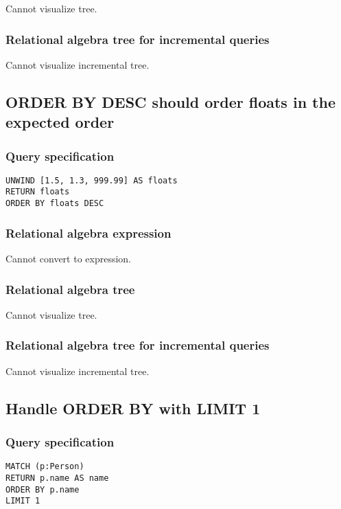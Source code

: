 Cannot visualize tree.

\subsubsection*{Relational algebra tree for incremental queries}

Cannot visualize incremental tree.

\subsection{ORDER BY DESC should order floats in the expected order}

\subsubsection*{Query specification}

\begin{lstlisting}
UNWIND [1.5, 1.3, 999.99] AS floats
RETURN floats
ORDER BY floats DESC
\end{lstlisting}

\subsubsection*{Relational algebra expression}

Cannot convert to expression.

\subsubsection*{Relational algebra tree}

Cannot visualize tree.

\subsubsection*{Relational algebra tree for incremental queries}

Cannot visualize incremental tree.

\subsection{Handle ORDER BY with LIMIT 1}

\subsubsection*{Query specification}

\begin{lstlisting}
MATCH (p:Person)
RETURN p.name AS name
ORDER BY p.name
LIMIT 1
\end{lstlisting}

